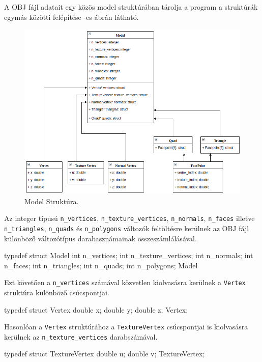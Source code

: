 A OBJ fájl adatait egy közös model struktúrában tárolja a program a struktúrák egymás közötti felépítése -es ábrán látható.
\bigskip
\begin{figure}[h]
\centering
\includegraphics[width=\textwidth]{images/struct.png}
\caption{Model Struktúra.}
\label{fig:struct}
\end{figure}
\bigskip

Az integer típusú \texttt{n\_vertices}, \texttt{n\_texture\_vertices}, \texttt{n\_normals}, \texttt{n\_faces} illetve \texttt{n\_triangles}, \texttt{n\_quads} és \texttt{n\_polygons} változók feltöltésre kerülnek az OBJ fájl különböző változótípus darabasznámainak összeszámlálásával.
\newpage
\begin{python}
typedef struct Model
{
    int n_vertices;
    int n_texture_vertices;
    int n_normals;
    int n_faces;
    int n_triangles;
    int n_quads;
    int n_polygons;
}Model
\end{python}
\bigskip

Ezt követően a \texttt{n\_vertices} számával közvetlen kiolvasásra kerülnek a \texttt{Vertex} struktúra különböző csúcspontjai.
\bigskip
\begin{python} 
typedef struct Vertex
{
    double x;
    double y;
    double z;
}Vertex;
\end{python}
\bigskip

Hasonlóan a \texttt{Vertex} struktúrához a \texttt{TextureVertex} csúcspontjai is kiolvasásra kerülnek az \texttt{n\_texture\_vertices} darabszámával.
\bigskip
\begin{python}
typedef struct TextureVertex
{
    double u;
    double v;
}TextureVertex;
\end{python}
\bigskip

